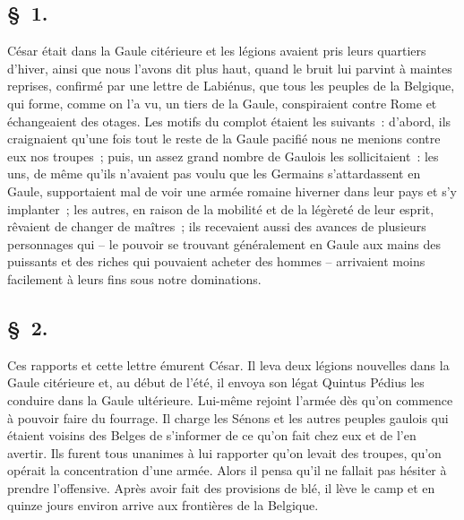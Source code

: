 \documentclass[french,twoside]{book} %
\begin{document}
\subsection[{§ 1.}]{ \textsc{§ 1.} }
\noindent César était dans la Gaule citérieure et les légions avaient pris leurs quartiers d’hiver, ainsi que nous l’avons dit plus haut, quand le bruit lui parvint à maintes reprises, confirmé par une lettre de Labiénus, que tous les peuples de la Belgique, qui forme, comme on l’a vu, un tiers de la Gaule, conspiraient contre Rome et échangeaient des otages. Les motifs du complot étaient les suivants : d’abord, ils craignaient qu’une fois tout le reste de la Gaule pacifié nous ne menions contre eux nos troupes ; puis, un assez grand nombre de Gaulois les sollicitaient : les uns, de même qu’ils n’avaient pas voulu que les Germains s’attardassent en Gaule, supportaient mal de voir une armée romaine hiverner dans leur pays et s’y implanter ; les autres, en raison de la mobilité et de la légèreté de leur esprit, rêvaient de changer de maîtres ; ils recevaient aussi des avances de plusieurs personnages qui – le pouvoir se trouvant généralement en Gaule aux mains des puissants et des riches qui pouvaient acheter des hommes – arrivaient moins facilement à leurs fins sous notre dominations.
\subsection[{§ 2.}]{ \textsc{§ 2.} }
\noindent Ces rapports et cette lettre émurent César. Il leva deux légions nouvelles dans la Gaule citérieure et, au début de l’été, il envoya son légat Quintus Pédius les conduire dans la Gaule ultérieure. Lui-même rejoint l’armée dès qu’on commence à pouvoir faire du fourrage. Il charge les Sénons et les autres peuples gaulois qui étaient voisins des Belges de s’informer de ce qu’on fait chez eux et de l’en avertir. Ils furent tous unanimes à lui rapporter qu’on levait des troupes, qu’on opérait la concentration d’une armée. Alors il pensa qu’il ne fallait pas hésiter à prendre l’offensive. Après avoir fait des provisions de blé, il lève le camp et en quinze jours environ arrive aux frontières de la Belgique.
\end{document}
